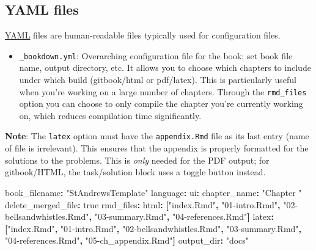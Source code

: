 \documentclass[
  oneside]{krantz}
\newenvironment{Shaded}{\begin{snugshade}}{\end{snugshade}}
\newcommand{\AttributeTok}[1]{\textcolor[rgb]{0.77,0.63,0.00}{#1}}
\newcommand{\CharTok}[1]{\textcolor[rgb]{0.31,0.60,0.02}{#1}}
\newcommand{\FunctionTok}[1]{\textcolor[rgb]{0.00,0.00,0.00}{#1}}
\newcommand{\KeywordTok}[1]{\textcolor[rgb]{0.13,0.29,0.53}{\textbf{#1}}}
\newcommand{\StringTok}[1]{\textcolor[rgb]{0.31,0.60,0.02}{#1}}
\providecommand{\tightlist}{%
  \setlength{\itemsep}{0pt}\setlength{\parskip}{0pt}}
\theoremstyle{definition}
\theoremstyle{definition}
\theoremstyle{definition}
\theoremstyle{remark}
\begin{document}
\hypertarget{yaml-files}{%
\subsection*{YAML files}\label{yaml-files}}


\href{https://en.wikipedia.org/wiki/YAML}{YAML} files are human-readable files typically used for configuration files.

\begin{itemize}
\tightlist
\item
  \texttt{\_bookdown.yml}: Overarching configuration file for the book; set book file name, output directory, etc. It allows you to choose which chapters to include under which build (gitbook/html or pdf/latex). This is particularly useful when you're working on a large number of chapters. Through the \texttt{rmd\_files} option you can choose to only compile the chapter you're currently working on, which reduces compilation time significantly.
\end{itemize}

\textbf{Note}: The \texttt{latex} option must have the \texttt{appendix.Rmd} file as its last entry (name of file is irrelevant). This ensures that the appendix is properly formatted for the solutions to the problems. This is \emph{only} needed for the PDF output; for gitbook/HTML, the task/solution block uses a toggle button instead.

\begin{Shaded}
\begin{Highlighting}[]
\FunctionTok{book_filename}\KeywordTok{:}\AttributeTok{ }\StringTok{"StAndrewsTemplate"}
\FunctionTok{language}\KeywordTok{:}
\AttributeTok{  }\FunctionTok{ui}\KeywordTok{:}
\AttributeTok{    }\FunctionTok{chapter_name}\KeywordTok{:}\AttributeTok{ }\StringTok{"Chapter "}
\FunctionTok{delete_merged_file}\KeywordTok{:}\AttributeTok{ }\CharTok{true}
\FunctionTok{rmd_files}\KeywordTok{:}
\AttributeTok{  }\FunctionTok{html}\KeywordTok{:}\AttributeTok{ }\KeywordTok{[}\StringTok{"index.Rmd"}\KeywordTok{,}\AttributeTok{ }\StringTok{"01-intro.Rmd"}\KeywordTok{,}\AttributeTok{ }\StringTok{"02-bellsandwhistles.Rmd"}\KeywordTok{,}\AttributeTok{ }\StringTok{"03-summary.Rmd"}\KeywordTok{,}\AttributeTok{ }\StringTok{"04-references.Rmd"}\KeywordTok{]}
\AttributeTok{  }\FunctionTok{latex}\KeywordTok{:}\AttributeTok{ }\KeywordTok{[}\StringTok{"index.Rmd"}\KeywordTok{,}\AttributeTok{ }\StringTok{"01-intro.Rmd"}\KeywordTok{,}\AttributeTok{ }\StringTok{"02-bellsandwhistles.Rmd"}\KeywordTok{,}\AttributeTok{ }\StringTok{"03-summary.Rmd"}\KeywordTok{,}\AttributeTok{  }\StringTok{"04-references.Rmd"}\KeywordTok{,}\AttributeTok{ }\StringTok{"05-ch_appendix.Rmd"}\KeywordTok{]}
\FunctionTok{output_dir}\KeywordTok{:}\AttributeTok{ }\StringTok{"docs"}
\end{Highlighting}
\end{Shaded}
\end{document}

